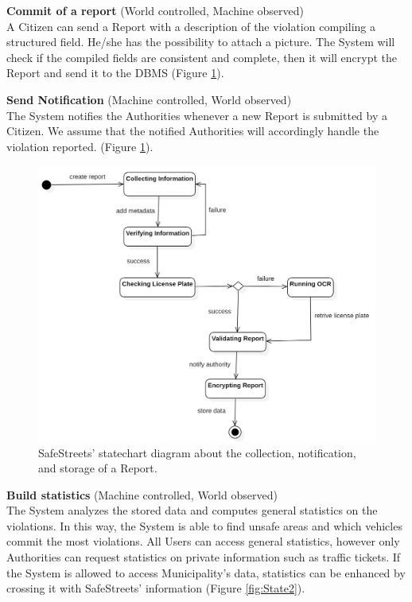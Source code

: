 \documentclass{report}
\begin{document}
\noindent\textbf{Commit of a report} (World controlled, Machine observed)\\
A Citizen can send a Report with a description of the violation compiling a structured field. He/she has the possibility to  attach a picture. The System will check if the compiled fields are consistent and complete, then it will encrypt the Report and send it to the DBMS (Figure \ref{fig:State1}). \\ \vspace{2mm}

\noindent\textbf{Send Notification} (Machine controlled, World observed)\\
The System notifies the Authorities whenever a new Report is submitted by a Citizen. 
We assume that the notified Authorities will accordingly handle the violation reported. (Figure \ref{fig:State1}).
\begin{figure}[!ht]
\begin{center}
\includegraphics[width=.8\textwidth]{./img/Statechart_Report.jpg}
\end{center}
\caption{SafeStreets' statechart diagram about the collection, notification, and storage of a Report.}
\label{fig:State1}
\end{figure} 
\newpage
\noindent\textbf{Build statistics} (Machine controlled, World observed)\\
The System analyzes the stored data and computes general statistics on the violations. In this way, the System is able to find unsafe areas and which vehicles commit the most violations. All Users can access general statistics, however only Authorities can request statistics on private information such as traffic tickets. If the System is allowed to access Municipality's data, statistics can be enhanced by crossing it with SafeStreets' information (Figure \ref{fig:State2}).  \\ \vspace{2mm}
\end{document}
